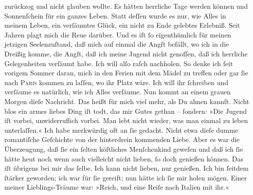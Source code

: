\begin{ledgroupsized}[t]{13cm}
               zurückzog und nicht glauben wollte. Es hätten herrliche Tage werden können und
               Sonnenſchein für ein ganzes Leben. Statt deſſen wurde es nur, wie Alles in meinem
               Leben, ein verſäumtes Glück, ein nicht zu Ende gelebtes Erlebniß. Seit Jahren plagt
               mich die Reue darüber. Und es iſt ſo eigenthümlich für meinen jetzigen Seelenzuſtand,
               daß mich auf einmal die Angſt befällt, wo ich in die Dreißig komme, die Angſt, daß
               ich \strikeout{\textcolor{gray}{d}} meine Jugend nicht genoſſen, daß ich herrliche Gelegenheiten verſäumt habe.
               Ich will alſo raſch nachholen. So denke ich ſeit vorigem Sommer daran, mich in den
               Ferien {\pb}mit dem Mädel zu treffen oder gar ſie nach \textsc{Paris} kommen zu laſſen, wo ihr Platz wäre. Ich will ihr ſchreiben und verſäume es
               natürlich, wie ich Alles verſäume. Nun kommt an einem grauen Morgen dieſe Nachricht.
               Das heißt für mich viel mehr, als Du ahnen kannſt. Nicht blos ein armes liebes Ding iſt todt, das mir Gutes
               gethan – ſondern: »Die Jugend iſt vorbei, unwiderruflich vorbei. Man lebt nicht
               wieder, was man einmal zu leben unterlaſſen.«\pend
           \pstart
           Ich habe merkwürdig oft an ſie gedacht. Nicht etwa dieſe dumme romantiſche Geſchichte
               von der hinterdrein kommenden Liebe. Aber  es war
               die Überzeugung, daß ſie ein
               ſelten köſtliches Menſchenkind geweſen {\pb}und daß ich ſie hätte
                  heut noch wenn auch vielleicht nicht lieben, ſo
               doch genießen können. Das iſt übrigens bei mir das ſelbe. Ich kann nicht lieben, nur
               genießen. Ich bin ſeitdem ſtärker geworden; ich war für ſie gereift; nun hätte ich
               ſie mir holen mögen. Einer meiner Lieblings-Träume war: »Reich, und eine Reiſe nach
                  Italien mit ihr.«\pend

\end{ledgroupsized}
